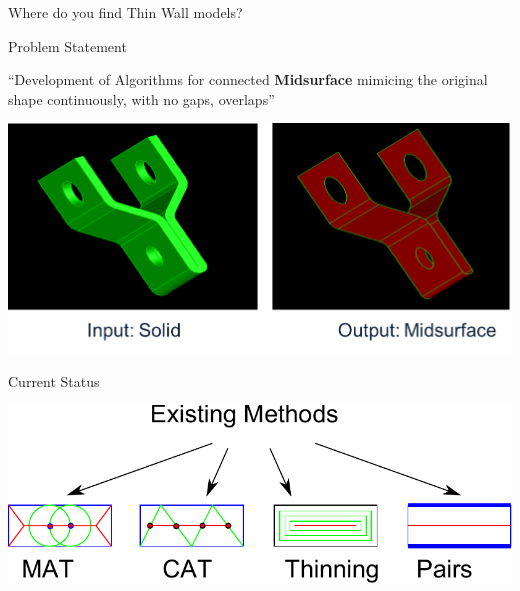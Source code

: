 \documentclass[final]{beamer}
\newlength{\onecolumnwidth}
\begin{document}
\begin{frame}[t]
\begin{columns}[t]
\begin{column}{\onecolumnwidth}
\begin{block}{Where do you find Thin Wall models?}
\begin{center}
		\end{center}
			
	\end{block}

			
	\begin{alertblock}{Problem Statement}
	
		\begin{center}
		
		{\Large ``Development of Algorithms for connected \textbf {Midsurface} mimicing 
		the original shape continuously, with no gaps, overlaps''}
		
		\bigskip
		
		\includegraphics[width=0.9\linewidth]{../Common/images/SolidToMidsurface.png}
		
		\end{center}
		
	\end{alertblock}
	
		\begin{block}{Current Status}
	
		\begin{center}
		
			\includegraphics[width=0.9\linewidth]{../Common/images/MedialMethodsOnly.pdf}
		
			\vspace{2em}
			

\end{center}
\end{block}
\end{column}
\end{columns}
\end{frame}
\end{document}
